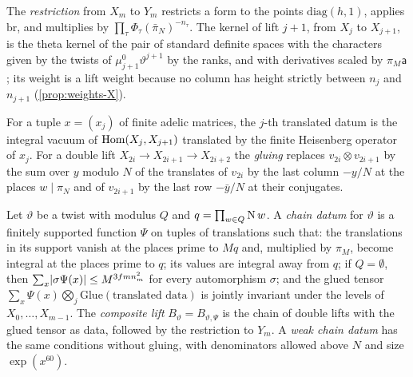 The \emph{restriction} from $X_m$ to $Y_m$ restricts a form to the points $\mathrm{diag}(h,1)$, applies $\mathrm{br}$, and
multiplies by $\prod_\tau\Phi_\tau(\bar\pi_N)^{-n_\tau}$. The kernel of lift $j+1$, from $X_j$ to $X_{j+1}$, is the
theta kernel of the pair of standard definite spaces with the characters given by the twists of
$\mu_{j+1}^0\vartheta^{j+1}$ by the ranks, and with derivatives scaled by $\pi_M\mathsf a$; its weight is a lift weight
because no column has height strictly between $n_j$ and $n_{j+1}$ (\cref{prop:weights-X}).

For a tuple $x=(x_j)$ of finite adelic matrices, the $j$-th translated datum is the integral vacuum of
$\operatorname{Hom}(X_j,X_{j+1})$ translated by the finite Heisenberg operator of $x_j$. For a double lift $X_{2i}\to
X_{2i+1}\to X_{2i+2}$ the \emph{gluing} replaces $v_{2i}\otimes v_{2i+1}$ by the sum over $y$ modulo $N$ of the
translates of $v_{2i}$ by the last column $-y/N$ at the places $w\mid\pi_N$ and of $v_{2i+1}$ by the last row
$-\bar y/N$ at their conjugates.

\begin{definition}\label{def:chain-datum}
Let $\vartheta$ be a twist with modulus $Q$ and $q=\prod_{w\in Q}\operatorname{N} w$. A \emph{chain datum} for $\vartheta$ is a finitely
supported function $\Psi$ on tuples of translations such that: the translations in its support vanish at the
places prime to $Mq$ and, multiplied by $\pi_M$, become integral at the places prime to $q$; its values are
integral away from $q$; if $Q=\emptyset$, then $\sum_x\lvert \sigma\Psi(x)\rvert\le M^{3fmn_m^2}$ for every automorphism
$\sigma$; and the glued tensor $\sum_x\Psi(x)\bigotimes_j\mathrm{Glue}(\text{translated data})$ is jointly invariant
under the levels of $X_0,\dots,X_{m-1}$. The \emph{composite lift} $B_\vartheta=B_{\vartheta,\Psi}$ is the chain of double
lifts with the glued tensor as data, followed by the restriction to $Y_m$. A \emph{weak chain datum} has the same
conditions without gluing, with denominators allowed above $N$ and size $\exp(x^{60})$.
\end{definition}


